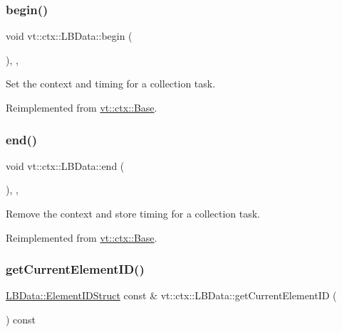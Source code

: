 \subsubsection{\texorpdfstring{begin()}{begin()}}
{\footnotesize\ttfamily void vt\+::ctx\+::\+L\+B\+Data\+::begin (\begin{DoxyParamCaption}{ }\end{DoxyParamCaption})\hspace{0.3cm}{\ttfamily [final]}, {\ttfamily [override]}, {\ttfamily [virtual]}}



Set the context and timing for a collection task. 



Reimplemented from \hyperlink{structvt_1_1ctx_1_1_base_aab5524952e1bb163ccba5df64a303168}{vt\+::ctx\+::\+Base}.

\mbox{\label{structvt_1_1ctx_1_1_l_b_data_a1a3b7728a5b9948183136c1ccec42d41}} 
\subsubsection{\texorpdfstring{end()}{end()}}
{\footnotesize\ttfamily void vt\+::ctx\+::\+L\+B\+Data\+::end (\begin{DoxyParamCaption}{ }\end{DoxyParamCaption})\hspace{0.3cm}{\ttfamily [final]}, {\ttfamily [override]}, {\ttfamily [virtual]}}



Remove the context and store timing for a collection task. 



Reimplemented from \hyperlink{structvt_1_1ctx_1_1_base_a113bac732b2831caa8eed11609ccaf0e}{vt\+::ctx\+::\+Base}.

\mbox{\label{structvt_1_1ctx_1_1_l_b_data_ac2f63d7854e0c1d4c1c2b9ddf200f8c6}} 
\subsubsection{\texorpdfstring{get\+Current\+Element\+I\+D()}{getCurrentElementID()}}
{\footnotesize\ttfamily \hyperlink{structvt_1_1ctx_1_1_l_b_data_aad9fac05c3faf80173b273d900db6fb1}{L\+B\+Data\+::\+Element\+I\+D\+Struct} const  \& vt\+::ctx\+::\+L\+B\+Data\+::get\+Current\+Element\+ID (\begin{DoxyParamCaption}{ }\end{DoxyParamCaption}) const}



